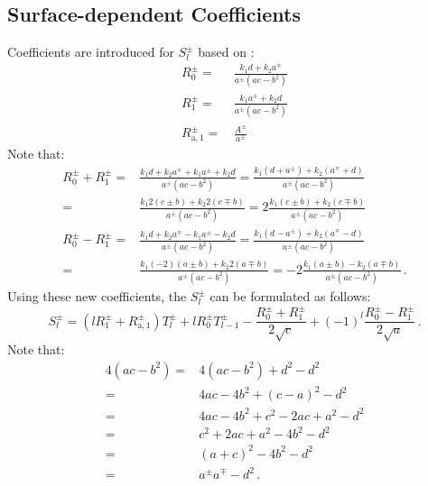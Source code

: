 \FloatBarrier
\subsection{Surface-dependent Coefficients}
Coefficients are introduced for $S^{\pm}_l$ based on :
\begin{align}
  R^{\pm}_0              =&\, \frac{k_1 d       + k_2 a^{\mp}}{a^{\pm}(ac-b^2)} \\
  R^{\pm}_1              =&\, \frac{k_1 a^{\pm} + k_2 d      }{a^{\pm}(ac-b^2)} \\
  R^{\pm}_{\mathrm{a},1} =&\, \frac{A^{\pm}}{a^{\pm}}
\end{align}
Note that:
\begin{align}
  R^{\pm}_0 + R^{\pm}_1 =& \frac{k_1  d + k_2  a^{\mp} + k_1 a^{\pm} + k_2 d }{a^{\pm}(ac-b^2)}
                        =  \frac{k_1 (d + a^{\pm}) + k_2 (a^{\mp} + d) }{a^{\pm}(ac-b^2)} \nonumber \\
                        =& \frac{k_1 2 (c \pm b) + k_2 2 (c \mp b) }{a^{\pm}(ac-b^2)}
                        =  2 \frac{k_1 (c \pm b) + k_2 (c \mp b) }{a^{\pm}(ac-b^2)} \\
  R^{\pm}_0 - R^{\pm}_1 =& \frac{k_1  d + k_2  a^{\mp} - k_1 a^{\pm} - k_2 d }{a^{\pm}(ac-b^2)}
                        =  \frac{k_1 (d - a^{\pm}) + k_2 (a^{\mp} - d) }{a^{\pm}(ac-b^2)} \nonumber \\
                        =& \frac{k_1 (-2) (a \pm b) + k_2 2 (a \mp b) }{a^{\pm}(ac-b^2)}
                        = -2 \frac{k_1 (a \pm b) - k_2 (a \mp b) }{a^{\pm}(ac-b^2)} \, .
\end{align}
Using these new coefficients, the $S^{\pm}_l$ can be formulated as follows:
\begin{equation}
  S^{\pm}_l =   \left(l R^{\pm}_1 + R^{\pm}_{\mathrm{a},1} \right) T^{\pm}_l + l R^{\pm}_0 T^{\pm}_{l-1}
              -        \frac{R^{\pm}_0 + R^{\pm}_1}{2 \sqrt{c}}
              + (-1)^l \frac{R^{\pm}_0 - R^{\pm}_1}{2 \sqrt{a}} \, .
\end{equation}
Note that:
\begin{align}
  4(ac-b^2)
  =& 4(ac-b^2)+d^2-d^2 \nonumber \\
  =& 4ac-4b^2+(c-a)^2-d^2 \nonumber \\
  =& 4ac-4b^2+c^2-2ac+a^2-d^2 \nonumber \\
  =& c^2+2ac+a^2 - 4b^2 - d^2 \nonumber \\
  =& (a+c)^2-4b^2 - d^2 \nonumber \\
  =& a^{\pm}a^{\mp} - d^2 \, .
\end{align}

